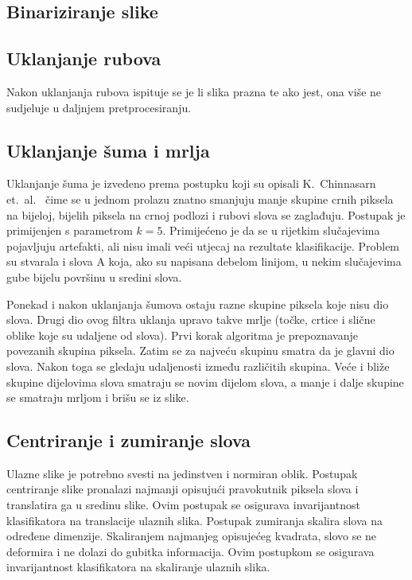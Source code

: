 \documentclass[a4paper,twocolumn,dvipdfm]{article}
\begin{document}
\subsection{Binariziranje slike}

\subsection{Uklanjanje rubova}


Nakon uklanjanja rubova ispituje se je li slika prazna te ako jest, ona više ne sudjeluje u daljnjem pretprocesiranju.

\subsection{Uklanjanje šuma i mrlja}
Uklanjanje šuma je izvedeno prema postupku koji su opisali K.\ Chinnasarn et.\
al.\ \cite{chinnasarn2002removing} čime se u jednom prolazu znatno smanjuju
manje skupine crnih piksela na bijeloj, bijelih piksela na crnoj podlozi i
rubovi slova se zaglađuju. Postupak je primijenjen s parametrom $k = 5$.
Primijećeno je da se u rijetkim slučajevima pojavljuju artefakti, ali nisu imali
veći utjecaj na rezultate klasifikacije. Problem su stvarala i slova A koja, ako
su napisana debelom linijom, u nekim slučajevima gube bijelu površinu u sredini
slova.

Ponekad i nakon uklanjanja šumova ostaju razne skupine piksela koje nisu dio
slova. Drugi dio ovog filtra uklanja upravo takve mrlje (točke, crtice i slične
oblike koje su udaljene od slova). Prvi korak algoritma je prepoznavanje
povezanih skupina piksela. Zatim se za najveću skupinu smatra da je glavni dio
slova. Nakon toga se gledaju udaljenosti između različitih skupina. Veće i
bliže skupine dijelovima slova smatraju se novim dijelom slova, a manje i dalje
skupine se smatraju mrljom i brišu se iz slike.

\subsection{Centriranje i zumiranje slova}
Ulazne slike je potrebno svesti na jedinstven i normiran oblik. Postupak 
centriranje slike pronalazi najmanji opisujući pravokutnik piksela slova  
i translatira ga u sredinu slike. Ovim postupak se osigurava invarijantnost
klasifikatora na translacije ulaznih slika. Postupak zumiranja skalira slova 
na određene dimenzije. Skaliranjem najmanjeg opisujećeg kvadrata, slovo se 
ne deformira i ne dolazi do gubitka informacija. Ovim postupkom se osigurava 
invarijantnost klasifikatora na skaliranje ulaznih slika.
\end{document}
